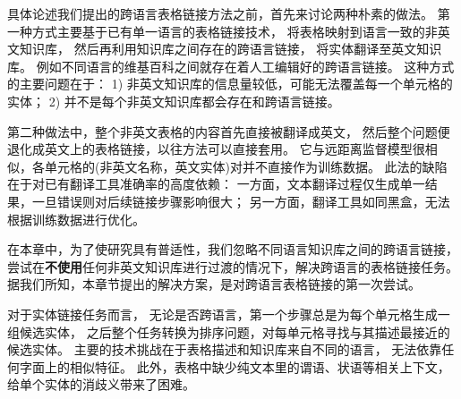 

具体论述我们提出的跨语言表格链接方法之前，首先来讨论两种朴素的做法。
第一种方式主要基于已有单一语言的表格链接技术，
将表格映射到语言一致的非英文知识库，
然后再利用知识库之间存在的跨语言链接，%
将实体翻译至英文知识库。
例如不同语言的维基百科之间就存在着人工编辑好的跨语言链接。
这种方式的主要问题在于：
1) 非英文知识库的信息量较低，可能无法覆盖每一个单元格的实体；
2) 并不是每个非英文知识库都会存在和跨语言链接。

第二种做法中，整个非英文表格的内容首先直接被翻译成英文，
然后整个问题便退化成英文上的表格链接，以往方法可以直接套用。%
它与远距离监督模型很相似，各单元格的(非英文名称，英文实体)对并不直接作为训练数据。
此法的缺陷在于对已有翻译工具准确率的高度依赖：
一方面，文本翻译过程仅生成单一结果，一旦错误则对后续链接步骤影响很大；
另一方面，翻译工具如同黑盒，无法根据训练数据进行优化。

在本章中，为了使研究具有普适性，我们忽略不同语言知识库之间的跨语言链接，
尝试在\textbf{不使用}任何非英文知识库进行过渡的情况下，解决跨语言的表格链接任务。
据我们所知，本章节提出的解决方案，是对跨语言表格链接的第一次尝试。

对于实体链接任务而言，
无论是否跨语言，第一个步骤总是为每个单元格生成一组候选实体，
之后整个任务转换为排序问题，对每单元格寻找与其描述最接近的候选实体。
主要的技术挑战在于表格描述和知识库来自不同的语言，
无法依靠任何字面上的相似特征。
此外，表格中缺少纯文本里的谓语、状语等相关上下文，
给单个实体的消歧义带来了困难。



